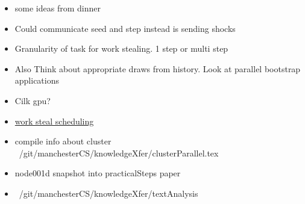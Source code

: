\documentclass[hyperref]{labbook}
\begin{document}









\begin{itemize}
\item some ideas from dinner
\item Could communicate seed and step instead is sending shocks
\item Granularity of task for work stealing.  1 step or multi step
\item Also Think about appropriate draws from history.  Look at parallel bootstrap applications
\item  Cilk gpu?
\item \href{http://paralleltasks.codeplex.com/}{work steal scheduling}
\end{itemize}





 \begin{itemize}
 \item compile info about cluster ~/git/manchesterCS/knowledgeXfer/clusterParallel.tex
 \item node001d snapshot into practicalSteps paper
 \end{itemize}

 \begin{itemize}
 \item ~/git/manchesterCS/knowledgeXfer/textAnalysis
 \end{itemize}
\end{document}
